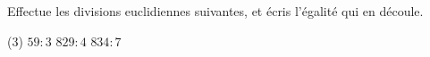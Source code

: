 %
%
Effectue les divisions euclidiennes suivantes, et écris l'égalité qui en découle.
    \begin{tasks}(3)
        \task $59 : 3$
        \task $829 : 4$
        \task $834 : 7$
    \end{tasks}
